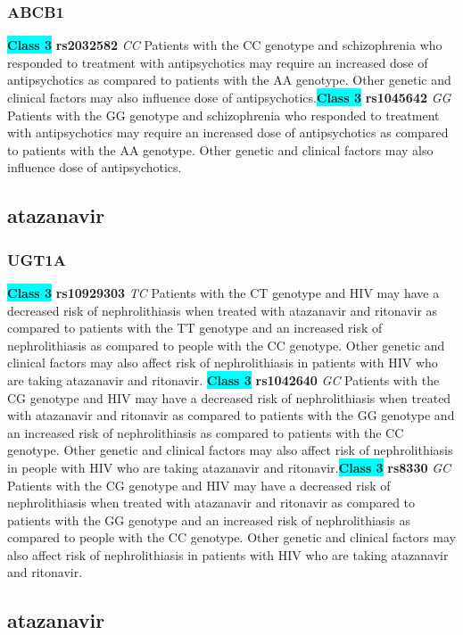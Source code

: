 \documentclass{book}
\begin{document}
\subsubsection{ ABCB1 }

\begin{center}
\textbf{\colorbox{cyan} {Class 3}} \textbf{ rs2032582 } \textit{ CC }
Patients with the CC genotype and schizophrenia who responded to treatment with antipsychotics may require an increased dose of antipsychotics as compared to patients with the AA genotype. Other genetic and clinical factors may also influence dose of antipsychotics.\textbf{\colorbox{cyan} {Class 3}} \textbf{ rs1045642 } \textit{ GG }
Patients with the GG genotype and schizophrenia who responded to treatment with antipsychotics may require an increased dose of antipsychotics as compared to patients with the AA genotype. Other genetic and clinical factors may also influence dose of antipsychotics. 


\end{center}\subsection{ atazanavir }


\subsubsection{ UGT1A }

\begin{center}
\textbf{\colorbox{cyan} {Class 3}} \textbf{ rs10929303 } \textit{ TC }
Patients with the CT genotype and HIV may have a decreased risk of nephrolithiasis when treated with atazanavir and ritonavir as compared to patients with the TT genotype and an increased risk of nephrolithiasis as compared to people with the CC genotype. Other genetic and clinical factors may also affect risk of nephrolithiasis in patients with HIV who are taking atazanavir and ritonavir. \textbf{\colorbox{cyan} {Class 3}} \textbf{ rs1042640 } \textit{ GC }
Patients with the CG genotype and HIV may have a decreased risk of nephrolithiasis when treated with atazanavir and ritonavir as compared to patients with the GG genotype and an increased risk of nephrolithiasis as compared to patients with the CC genotype. Other genetic and clinical factors may also affect risk of nephrolithiasis in people with HIV who are taking atazanavir and ritonavir.\textbf{\colorbox{cyan} {Class 3}} \textbf{ rs8330 } \textit{ GC }
Patients with the CG genotype and HIV may have a decreased risk of nephrolithiasis when treated with atazanavir and ritonavir as compared to patients with the GG genotype and an increased risk of nephrolithiasis as compared to people with the CC genotype. Other genetic and clinical factors may also affect risk of nephrolithiasis in patients with HIV who are taking atazanavir and ritonavir.


\end{center}\subsection{ atazanavir }
\end{document}
